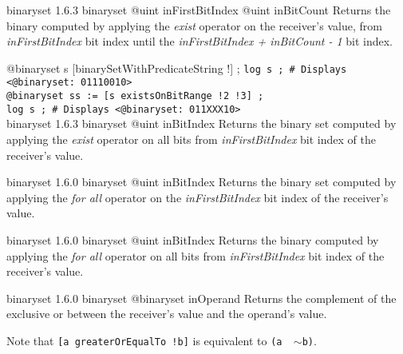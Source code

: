 {binaryset}
{1.6.3}
{binaryset}
{@uint inFirstBitIndex}
{@uint inBitCount}
{Returns the binary computed by applying the \emph{exist} operator on the receiver's value, from \emph{inFirstBitIndex} bit index until the \emph{inFirstBitIndex + inBitCount - 1} bit index.}
{}


\exempleUneLigne
{}
{@binaryset s [binarySetWithPredicateString !\textquotedbl] ;}
\texttt{log s ; \# Displays <@binaryset:~01110010>}\\
\texttt{@binaryset ss := [s existsOnBitRange !2 !3] ;}\\
\texttt{log s ; \# Displays <@binaryset:~011XXX10>}\\







{binaryset}
{1.6.3}
{binaryset}
{@uint inBitIndex}
{Returns the binary set computed by applying the \emph{exist} operator on all bits from \emph{inFirstBitIndex} bit index of the receiver's value.}
{}







{binaryset}
{1.6.0}
{binaryset}
{@uint inBitIndex}
{Returns the binary set computed by applying the \emph{for all} operator on the \emph{inFirstBitIndex} bit index of the receiver's value.}
{}







{binaryset}
{1.6.0}
{binaryset}
{@uint inBitIndex}
{Returns the binary computed by applying the \emph{for all} operator on all bits from \emph{inFirstBitIndex} bit index of the receiver's value.}
{}








{binaryset}
{1.6.0}
{binaryset}
{@binaryset inOperand}
{Returns the complement of the exclusive or between the receiver's value and the operand's value.}
{}

Note that \texttt{[a greaterOrEqualTo !b]} is equivalent to \texttt{(a \textbar ~$\sim$b)}.








